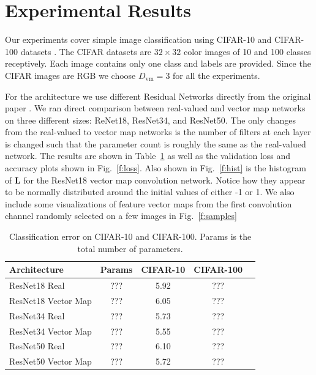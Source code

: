 \documentclass[14pt,a4paper]{article}
\begin{document}
\section{Experimental Results}
Our experiments cover simple image classification using CIFAR-10 and CIFAR-100 datasets \cite{krizhevsky2009learning}.
The CIFAR datasets are $32\times32$ color images of 10 and 100 classes receptively.
Each image contains only one class and labels are provided.
Since the CIFAR images are RGB we choose $D_\mathrm{vm} = 3$ for all the experiments.

For the architecture we use different Residual Networks directly from the original paper \cite{he2015deep}.
We ran direct comparison between real-valued and vector map networks on three different sizes: ReNet18, ResNet34, and ResNet50.
The only changes from the real-valued to vector map networks is the number of filters at each layer is changed such that the parameter count is roughly the same as the real-valued network.
The results are shown in Table~\ref{t:results} as well as the validation loss and accuracy plots shown in Fig.~\ref{f:loss}. 
Also shown in Fig.~\ref{f:hist} is the histogram of $\textbf{L}$ for the ResNet18 vector map convolution network.
Notice how they appear to be normally distributed around the initial values of either -1 or 1.
We also include some visualizations of feature vector maps from the first convolution channel randomly selected on a few images in Fig.~\ref{f:samples}

\begin{table}[h]
	\centering
		\begin{tabular}{l c c c c}
			\hline
			Architecture & Params & CIFAR-10 & CIFAR-100 \\
			\hline
			ResNet18 Real & ??? & 5.92 & ??? \\
			ResNet18 Vector Map & ??? & 6.05 & ??? \\
			\hline
			ResNet34 Real & ??? & 5.73 & ??? \\
			ResNet34 Vector Map & ??? & 5.55 & ??? \\
			\hline
			ResNet50 Real & ??? & 6.10 & ??? \\
			ResNet50 Vector Map & ??? & 5.72 & ??? \\
			\hline
		\end{tabular}
	\caption{Classification error on CIFAR-10 and CIFAR-100. Params is the total number of parameters.}
	\label{t:results}
\end{table}
\end{document}
